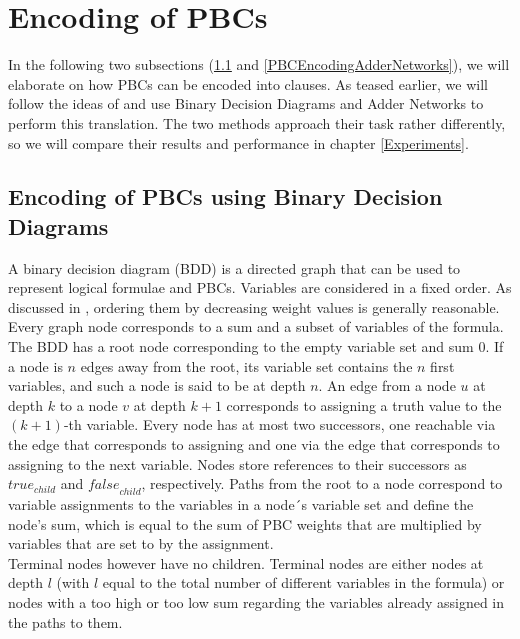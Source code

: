 \section{Encoding of PBCs}\label{encoding:PBCs}
In the following two subsections (\ref{PBCEncodingBDD} and \ref{PBCEncodingAdderNetworks}), we will elaborate on how PBCs can be encoded into clauses. As teased earlier, we will follow the ideas of \cite{Een2006TranslatingPC} and use Binary Decision Diagrams and Adder Networks to perform this translation. The two methods approach their task rather differently, so we will compare their results and performance in chapter \ref{Experiments}.

\subsection{Encoding of PBCs using Binary Decision Diagrams}\label{PBCEncodingBDD}
A binary decision diagram (BDD) is a directed graph that can be used to represent logical formulae and PBCs. 
Variables are considered in a fixed order. As discussed in \cite{Een2006TranslatingPC}, ordering them by decreasing weight values is generally reasonable. Every graph node corresponds to a sum and a subset of variables of the formula. The BDD has a root node corresponding to the empty variable set and sum 0. If a node is $n$ edges away from the root, its variable set contains the $n$ first variables, and such a node is said to be at depth $n$. An edge from a node $u$ at depth $k$ to a node $v$ at depth $k+1$ corresponds to assigning a truth value to the $(k+1)$-th variable. Every node has at most two successors, one reachable via the edge that corresponds to assigning \true{} and one via the edge that corresponds to assigning \false{} to the next variable. Nodes store references to their successors as \emph{$\textit{true}_{child}$} and \emph{$\textit{false}_{child}$}, respectively. Paths from the root to a node correspond to variable assignments to the variables in a node´s variable set and define the node's sum, which is equal to the sum of PBC weights that are multiplied by variables that are set to \true{} by the assignment.\\

Terminal nodes however have no children. Terminal nodes are either nodes at depth $l$ (with $l$ equal to the total number of different variables in the formula) or nodes with a too high or too low sum regarding the variables already assigned in the paths to them.\\

